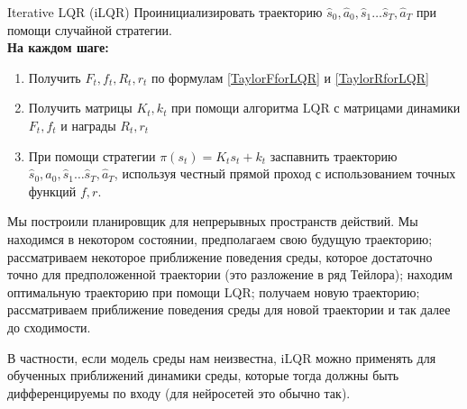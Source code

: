 \begin{algorithm}{Iterative LQR (iLQR)}
Проинициализировать траекторию $\hat{s}_0, \hat{a}_0, \hat{s}_1 \dots \hat{s}_T, \hat{a}_T$ при помощи случайной стратегии. \\ 
\textbf{На каждом шаге:}
\begin{enumerate}
    \item Получить $F_t, f_t, R_t, r_t$ по формулам \eqref{TaylorFforLQR} и \eqref{TaylorRforLQR}
    \item Получить матрицы $K_t, k_t$ при помощи алгоритма LQR с матрицами динамики $F_t, f_t$ и награды $R_t, r_t$
    \item При помощи стратегии $\pi(s_t) = K_t s_t + k_t$ заспавнить траекторию $\hat{s}_0, \hat{a}_0, \hat{s}_1 \dots \hat{s}_T, \hat{a}_T$, используя честный прямой проход с использованием точных функций $f, r$.
\end{enumerate}
\end{algorithm}

Мы построили планировщик для непрерывных пространств действий. Мы находимся в некотором состоянии, предполагаем свою будущую траекторию; рассматриваем некоторое приближение поведения среды, которое достаточно точно для предположенной траектории (это разложение в ряд Тейлора); находим оптимальную траекторию при помощи LQR; получаем новую траекторию; рассматриваем приближение поведения среды для новой траектории и так далее до сходимости.

В частности, если модель среды нам неизвестна, iLQR можно применять для обученных приближений динамики среды, которые тогда должны быть дифференцируемы по входу (для нейросетей это обычно так).